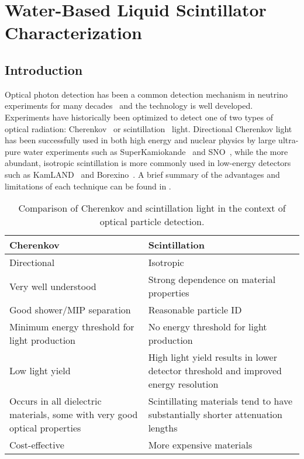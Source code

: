 \chapter{Water-Based Liquid Scintillator Characterization}
\label{ch:wbls}

\section{Introduction}

Optical photon detection has been a common detection mechanism in neutrino experiments for many decades~\cite{imb,superk,sno,kamland,borexino,lsnd} and the technology is well developed.
Experiments have historically been optimized to detect one of two types of optical radiation: Cherenkov~\cite{cherenkov} or scintillation~\cite{birks} light.  
Directional Cherenkov light has been successfully used in both high energy and nuclear physics by large ultra-pure water experiments such as SuperKamiokande~\cite{superk} and SNO~\cite{sno}, while the more abundant, isotropic scintillation is more commonly used in low-energy detectors such as KamLAND~\cite{kamland} and Borexino~\cite{borexino}.  
A brief summary of the advantages and limitations of each technique can be found in .

\begin{table}[]
\begin{tabularx}{\textwidth}{CC}
Cherenkov & Scintillation \\
\hline
\hline
Directional & Isotropic\\
\hline
Very well understood  & Strong dependence on material properties  \\
\hline
Good shower/MIP separation & Reasonable particle ID  \\
\hline
Minimum energy threshold for light production & No energy threshold for light production  \\
\hline
Low light yield & High light yield results in lower detector threshold and improved energy resolution \\
\hline
Occurs in all dielectric materials, some with very good optical properties & Scintillating materials tend to have substantially shorter attenuation lengths  \\
\hline
Cost-effective & More expensive materials \\
\end{tabularx}
\caption{Comparison of Cherenkov and scintillation light in the context of optical particle detection.}
\label{tab:chervsscint}
\end{table}

